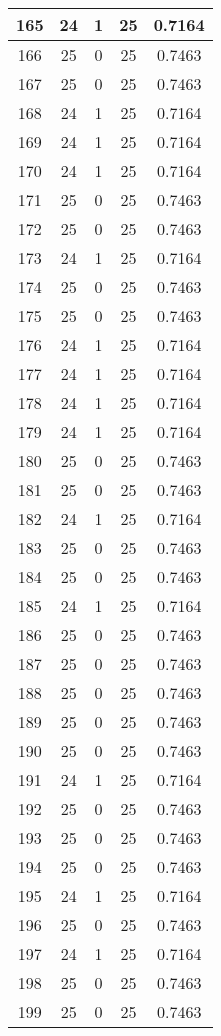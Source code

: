 \documentclass[letterpaper, 12pt]{article}
\begin{document}
\begin{longtable}{|c|c|c|c|c|}
\hline
165 & 24 & 1 & 25 & 0.7164 \\
\hline
166 & 25 & 0 & 25 & 0.7463 \\
\hline
167 & 25 & 0 & 25 & 0.7463 \\
\hline
168 & 24 & 1 & 25 & 0.7164 \\
\hline
169 & 24 & 1 & 25 & 0.7164 \\
\hline
170 & 24 & 1 & 25 & 0.7164 \\
\hline
171 & 25 & 0 & 25 & 0.7463 \\
\hline
172 & 25 & 0 & 25 & 0.7463 \\
\hline
173 & 24 & 1 & 25 & 0.7164 \\
\hline
174 & 25 & 0 & 25 & 0.7463 \\
\hline
175 & 25 & 0 & 25 & 0.7463 \\
\hline
176 & 24 & 1 & 25 & 0.7164 \\
\hline
177 & 24 & 1 & 25 & 0.7164 \\
\hline
178 & 24 & 1 & 25 & 0.7164 \\
\hline
179 & 24 & 1 & 25 & 0.7164 \\
\hline
180 & 25 & 0 & 25 & 0.7463 \\
\hline
181 & 25 & 0 & 25 & 0.7463 \\
\hline
182 & 24 & 1 & 25 & 0.7164 \\
\hline
183 & 25 & 0 & 25 & 0.7463 \\
\hline
184 & 25 & 0 & 25 & 0.7463 \\
\hline
185 & 24 & 1 & 25 & 0.7164 \\
\hline
186 & 25 & 0 & 25 & 0.7463 \\
\hline
187 & 25 & 0 & 25 & 0.7463 \\
\hline
188 & 25 & 0 & 25 & 0.7463 \\
\hline
189 & 25 & 0 & 25 & 0.7463 \\
\hline
190 & 25 & 0 & 25 & 0.7463 \\
\hline
191 & 24 & 1 & 25 & 0.7164 \\
\hline
192 & 25 & 0 & 25 & 0.7463 \\
\hline
193 & 25 & 0 & 25 & 0.7463 \\
\hline
194 & 25 & 0 & 25 & 0.7463 \\
\hline
195 & 24 & 1 & 25 & 0.7164 \\
\hline
196 & 25 & 0 & 25 & 0.7463 \\
\hline
197 & 24 & 1 & 25 & 0.7164 \\
\hline
198 & 25 & 0 & 25 & 0.7463 \\
\hline
199 & 25 & 0 & 25 & 0.7463 \\
\hline
\end{longtable}
\end{document}
